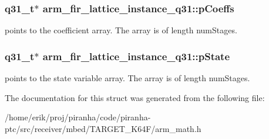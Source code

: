 \subsubsection[{\texorpdfstring{p\+Coeffs}{pCoeffs}}]{\setlength{\rightskip}{0pt plus 5cm}q31\+\_\+t$\ast$ arm\+\_\+fir\+\_\+lattice\+\_\+instance\+\_\+q31\+::p\+Coeffs}\hypertarget{structarm__fir__lattice__instance__q31_a66c3364bf5863cd45e05f1652c3dc522}{}\label{structarm__fir__lattice__instance__q31_a66c3364bf5863cd45e05f1652c3dc522}
points to the coefficient array. The array is of length num\+Stages. 
\subsubsection[{\texorpdfstring{p\+State}{pState}}]{\setlength{\rightskip}{0pt plus 5cm}q31\+\_\+t$\ast$ arm\+\_\+fir\+\_\+lattice\+\_\+instance\+\_\+q31\+::p\+State}\hypertarget{structarm__fir__lattice__instance__q31_a08fe9494ab7cd336b791e9657adadcf6}{}\label{structarm__fir__lattice__instance__q31_a08fe9494ab7cd336b791e9657adadcf6}
points to the state variable array. The array is of length num\+Stages. 

The documentation for this struct was generated from the following file\+:\begin{DoxyCompactItemize}
\item 
/home/erik/proj/piranha/code/piranha-\/ptc/src/receiver/mbed/\+T\+A\+R\+G\+E\+T\+\_\+\+K64\+F/arm\+\_\+math.\+h\end{DoxyCompactItemize}
